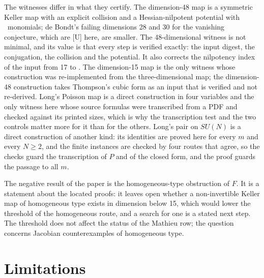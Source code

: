\documentclass[11pt]{article}
\theoremstyle{remark}
\begin{document}
The witnesses differ in what they certify. The dimension-48 map is a symmetric Keller map with an explicit collision and a Hessian-nilpotent potential with \npotentialmon\ monomials; de Bondt's failing dimensions 28 and 30 for the vanishing conjecture, which are [U] here, are smaller. The 48-dimensional witness is not minimal, and its value is that every step is verified exactly: the input digest, the conjugation, the collision and the potential. It also corrects the nilpotency index of the input from 17 to \nnilindex. The dimension-15 map is the only witness whose construction was re-implemented from the three-dimensional map; the dimension-48 construction takes Thompson's cubic form as an input that is verified and not re-derived. Long's Poisson map is a direct construction in four variables and the only witness here whose source formulas were transcribed from a PDF and checked against its printed sizes, which is why the transcription test and the two controls matter more for it than for the others. Long's pair on $SU(N)$ is a direct construction of another kind: its identities are proved here for every $m$ and every $N\ge2$, and the finite instances are checked by four routes that agree, so the checks guard the transcription of $P$ and of the closed form, and the proof guards the passage to all $m$.

The negative result of the paper is the homogeneous-type obstruction of $F$. It is a statement about the located proofs: it leaves open whether a non-invertible Keller map of homogeneous type exists in dimension below 15, which would lower the threshold of the homogeneous route, and a search for one is a stated next step. The threshold does not affect the status of the Mathieu row; the question concerns Jacobian counterexamples of homogeneous type.

\section{Limitations}\label{sec:limitations}
\end{document}
